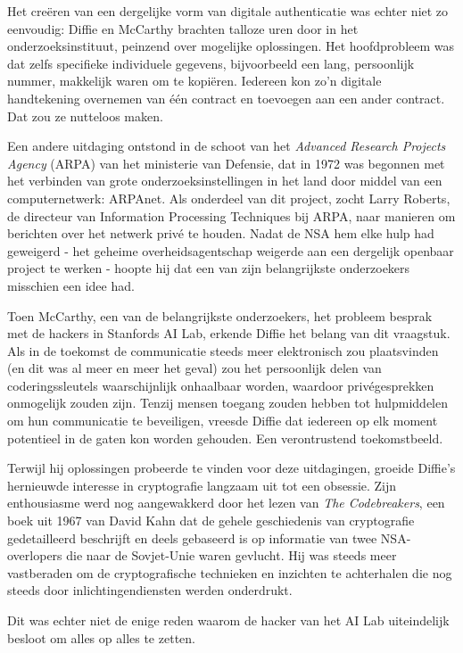 \documentclass[
  a5paper,
  smalldemyvopaper,11pt,twoside,onecolumn,openright,extrafontsizes,
hidelinks]{memoir}
\begin{document}
Het creëren van een dergelijke vorm van digitale authenticatie was
echter niet zo eenvoudig: Diffie en McCarthy brachten talloze uren door
in het onderzoeksinstituut, peinzend over mogelijke oplossingen. Het
hoofdprobleem was dat zelfs specifieke individuele gegevens,
bijvoorbeeld een lang, persoonlijk nummer, makkelijk waren om te
kopiëren. Iedereen kon zo'n digitale handtekening overnemen van één
contract en toevoegen aan een ander contract. Dat zou ze nutteloos
maken.

Een andere uitdaging ontstond in de schoot van het \emph{Advanced
Research Projects Agency} (ARPA) van het ministerie van Defensie, dat in
1972 was begonnen met het verbinden van grote onderzoeksinstellingen in
het land door middel van een computernetwerk: ARPAnet. Als onderdeel van
dit project, zocht Larry Roberts, de directeur van Information
Processing Techniques bij ARPA, naar manieren om berichten over het
netwerk privé te houden. Nadat de NSA hem elke hulp had geweigerd - het
geheime overheidsagentschap weigerde aan een dergelijk openbaar project
te werken - hoopte hij dat een van zijn belangrijkste onderzoekers
misschien een idee had.

Toen McCarthy, een van de belangrijkste onderzoekers, het probleem
besprak met de hackers in Stanfords AI Lab, erkende Diffie het belang
van dit vraagstuk. Als in de toekomst de communicatie steeds meer
elektronisch zou plaatsvinden (en dit was al meer en meer het geval) zou
het persoonlijk delen van coderingssleutels waarschijnlijk onhaalbaar
worden, waardoor privégesprekken onmogelijk zouden zijn. Tenzij mensen
toegang zouden hebben tot hulpmiddelen om hun communicatie te
beveiligen, vreesde Diffie dat iedereen op elk moment potentieel in de
gaten kon worden gehouden. Een verontrustend toekomstbeeld.

Terwijl hij oplossingen probeerde te vinden voor deze uitdagingen,
groeide Diffie's hernieuwde interesse in cryptografie langzaam uit tot
een obsessie. Zijn enthousiasme werd nog aangewakkerd door het lezen van
\emph{The Codebreakers}, een boek uit 1967 van David Kahn dat de gehele
geschiedenis van cryptografie gedetailleerd beschrijft en deels
gebaseerd is op informatie van twee NSA-overlopers die naar de
Sovjet-Unie waren gevlucht. Hij was steeds meer vastberaden om de
cryptografische technieken en inzichten te achterhalen die nog steeds
door inlichtingendiensten werden onderdrukt.

Dit was echter niet de enige reden waarom de hacker van het AI Lab
uiteindelijk besloot om alles op alles te zetten.
\end{document}
